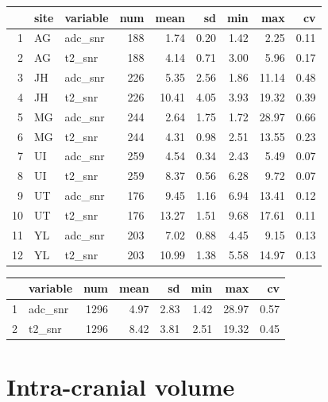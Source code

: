 \documentclass[
]{article}
\begin{document}
\begin{table}[ht]
\centering
\begin{tabular}{rllrrrrrr}
  \hline
 & site & variable & num & mean & sd & min & max & cv \\ 
  \hline
1 & AG & adc\_snr & 188 & 1.74 & 0.20 & 1.42 & 2.25 & 0.11 \\ 
  2 & AG & t2\_snr & 188 & 4.14 & 0.71 & 3.00 & 5.96 & 0.17 \\ 
  3 & JH & adc\_snr & 226 & 5.35 & 2.56 & 1.86 & 11.14 & 0.48 \\ 
  4 & JH & t2\_snr & 226 & 10.41 & 4.05 & 3.93 & 19.32 & 0.39 \\ 
  5 & MG & adc\_snr & 244 & 2.64 & 1.75 & 1.72 & 28.97 & 0.66 \\ 
  6 & MG & t2\_snr & 244 & 4.31 & 0.98 & 2.51 & 13.55 & 0.23 \\ 
  7 & UI & adc\_snr & 259 & 4.54 & 0.34 & 2.43 & 5.49 & 0.07 \\ 
  8 & UI & t2\_snr & 259 & 8.37 & 0.56 & 6.28 & 9.72 & 0.07 \\ 
  9 & UT & adc\_snr & 176 & 9.45 & 1.16 & 6.94 & 13.41 & 0.12 \\ 
  10 & UT & t2\_snr & 176 & 13.27 & 1.51 & 9.68 & 17.61 & 0.11 \\ 
  11 & YL & adc\_snr & 203 & 7.02 & 0.88 & 4.45 & 9.15 & 0.13 \\ 
  12 & YL & t2\_snr & 203 & 10.99 & 1.38 & 5.58 & 14.97 & 0.13 \\ 
   \hline
\end{tabular}
\end{table}
\begin{table}[ht]
\centering
\begin{tabular}{rlrrrrrr}
  \hline
 & variable & num & mean & sd & min & max & cv \\ 
  \hline
1 & adc\_snr & 1296 & 4.97 & 2.83 & 1.42 & 28.97 & 0.57 \\ 
  2 & t2\_snr & 1296 & 8.42 & 3.81 & 2.51 & 19.32 & 0.45 \\ 
   \hline
\end{tabular}
\end{table}

\hypertarget{intra-cranial-volume}{%
\section{Intra-cranial volume}\label{intra-cranial-volume}}
\end{document}
